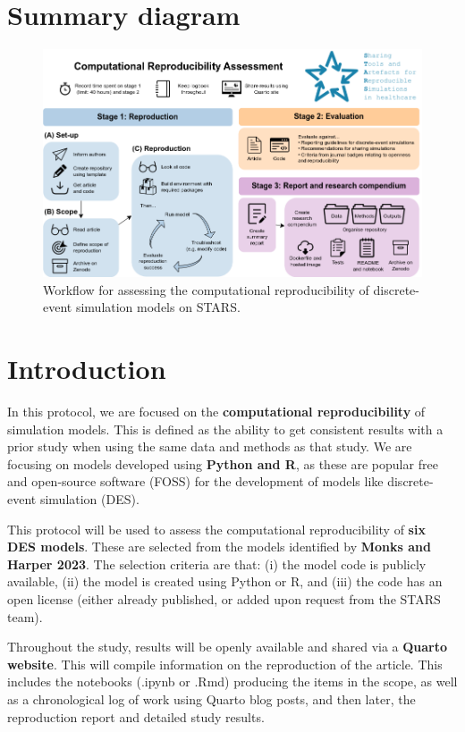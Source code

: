 \section{Summary diagram}

\begin{figure}[!htb]
    \includegraphics[width=1\linewidth]{images/stars_wp1_workflow_4.drawio.png}
    \caption{Workflow for assessing the computational reproducibility of discrete-event simulation models on STARS.}
\end{figure}

\newpage
\section{Introduction}

In this protocol, we are focused on the \textbf{computational reproducibility} of simulation models. This is defined as the ability to get consistent results with a prior study when using  the same data and methods as that study. We are focusing on models developed using \textbf{Python and R}, as these are popular free and open-source software (FOSS) for the development of models like discrete-event simulation (DES).\autocite{monks_computer_2023}

This protocol will be used to assess the computational reproducibility of \textbf{six DES models}. These are selected from the models identified by \textbf{Monks and Harper 2023}.\autocite{monks_computer_2023} The selection criteria are that: (i) the model code is publicly available, (ii) the model is created using Python or R, and (iii) the code has an open license (either already published, or added upon request from the STARS team).

Throughout the study, results will be openly available and shared via a \textbf{Quarto website}. This will compile information on the reproduction of the article. This includes the notebooks (.ipynb or .Rmd) producing the items in the scope, as well as a chronological log of work using Quarto blog posts, and then later, the reproduction report and detailed study results.

